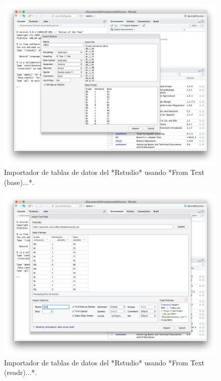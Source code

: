 \documentclass[
]{book}
\theoremstyle{definition}
\theoremstyle{definition}
\theoremstyle{definition}
\theoremstyle{remark}
\begin{document}
\begin{figure}

{\centering \includegraphics[width=0.9\linewidth]{AprendeR-Parte-I_files/figure-html/figID1} 

}

\caption{Importador de tablas de datos del *Rstudio* usando *From Text (base)...*.}\label{fig:ID1}
\end{figure}

\begin{figure}

{\centering \includegraphics[width=0.9\linewidth]{AprendeR-Parte-I_files/figure-html/figID2} 

}

\caption{Importador de tablas de datos del *Rstudio* usando *From Text (readr)...*.}\label{fig:ID2}
\end{figure}
\end{document}
